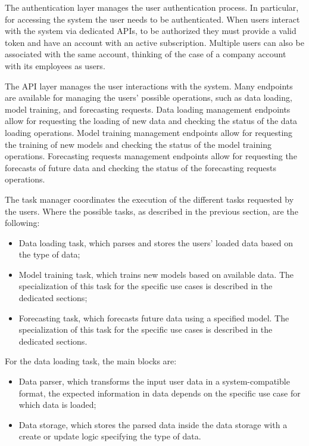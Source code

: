 The authentication layer manages the user authentication process.
In particular, for accessing the system the user needs to be authenticated.
When users interact with the system via dedicated APIs, to be authorized they must provide a valid token and have an account with an active subscription.
Multiple users can also be associated with the same account, thinking of the case of a company account with its employees as users.

The API layer manages the user interactions with the system.
Many endpoints are available for managing the users' possible operations, such as data loading, model training, and forecasting requests.
Data loading management endpoints allow for requesting the loading of new data and checking the status of the data loading operations.
Model training management endpoints allow for requesting the training of new models and checking the status of the model training operations.
Forecasting requests management endpoints allow for requesting the forecasts of future data and checking the status of the forecasting requests operations.

The task manager coordinates the execution of the different tasks requested by the users.
Where the possible tasks, as described in the previous section, are the following:
\begin{itemize}
  \item Data loading task, which parses and stores the users' loaded data based on the type of data;
  \item Model training task, which trains new models based on available data. The specialization of this task for the specific use cases is described in the dedicated sections;
  \item Forecasting task, which forecasts future data using a specified model. The specialization of this task for the specific use cases is described in the dedicated sections.
\end{itemize}

For the data loading task, the main blocks are:
\begin{itemize}
  \item Data parser, which transforms the input user data in a system-compatible format, the expected information in data depends on the specific use case for which data is loaded;
  \item Data storage, which stores the parsed data inside the data storage with a create or update logic specifying the type of data.
\end{itemize}

